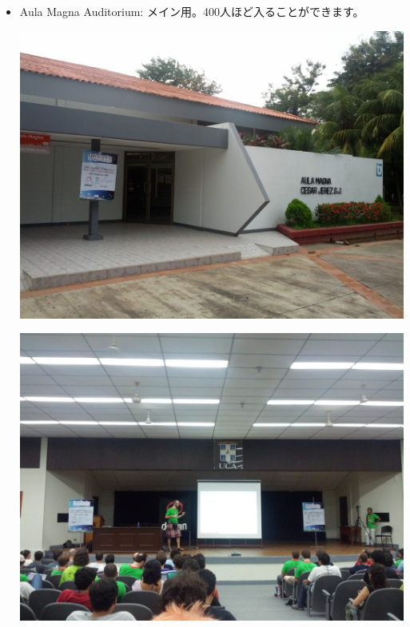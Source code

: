 \documentclass[mingoth,a4paper]{jsarticle}
\begin{document}
\begin{itemize}
  \item Aula Magna Auditorium: メイン用。400人ほど入ることができます。\\
	\begin{minipage}{0.4\hsize}
	\includegraphics[width=0.8\hsize]{image201208/debconf12_maintalk01.jpg}
        \end{minipage}
        \begin{minipage}{0.4\hsize}
        \includegraphics[width=0.8\hsize]{image201208/debconf12_maintalk02.jpg}
	\end{minipage}


\end{itemize}
\end{document}
